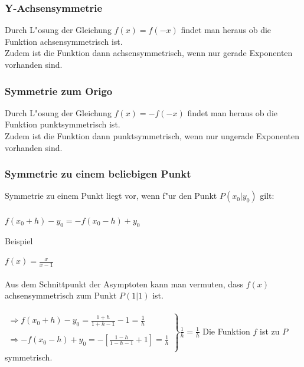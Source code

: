 \subsubsection{Y-Achsensymmetrie}

Durch L"osung der Gleichung $f(x)=f(-x)$ findet man heraus ob die Funktion achsensymmetrisch ist.\\
Zudem ist die Funktion dann achsensymmetrisch, wenn nur gerade Exponenten vorhanden sind.\\

\subsubsection{Symmetrie zum Origo}

Durch L"osung der Gleichung $f(x)=-f(-x)$ findet man heraus ob die Funktion punktsymmetrisch ist.\\
Zudem ist die Funktion dann punktsymmetrisch, wenn nur ungerade Exponenten vorhanden sind.\\


\subsubsection{Symmetrie zu einem beliebigen Punkt}

Symmetrie zu einem Punkt liegt vor, wenn f"ur den Punkt $P(x_{0}|y_{0})$ gilt:\\
\\
$f(x_{0}+h)-y_{0}=-f(x_{0}-h)+y_{0}$

\begin{Bemerkung}
Beispiel\\
\end{Bemerkung}
$f(x)=\frac{x}{x-1}$\\
\\
Aus dem Schnittpunkt der Asymptoten kann man vermuten, dass $f(x)$ achsensymmetrisch zum Punkt $P(1|1)$ ist.\\
\\
$\left. \begin{array}{rcl}
\Rightarrow f(x_{0}+h)-y_{0}=\frac{1+h}{1+h-1}-1=\frac{1}{h}\\
\\
\Rightarrow -f(x_{0}-h)+y_{0}=-[\frac{1-h}{1-h-1}+1]=\frac{1}{h}\\
\end{array}\right\} \frac{1}{h}=\frac{1}{h}$ Die Funktion $f$ ist zu $P$ symmetrisch.\\



